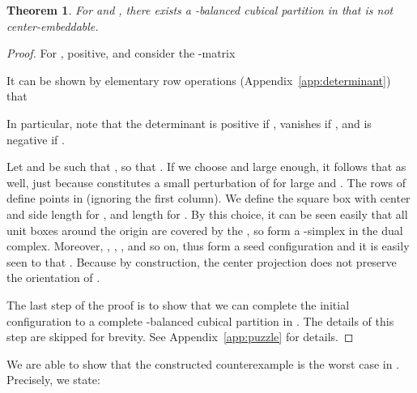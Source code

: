 \documentclass[12pt]{article}
\newtheorem{theorem}{Theorem}
\begin{document}
\begin{theorem}\label{thm:counter_beta_balanced_dd}
For  and , 
there exists a -balanced cubical partition in  that is not
center-embeddable.
\end{theorem}
\begin{proof}
For ,  positive, and  consider the -matrix

It can be shown by elementary row operations (Appendix~\ref{app:determinant}) that

In particular, note that the determinant is positive 
if , vanishes if ,
and is negative if .

Let  and  be such that 
, so that
. If we choose  and 
large enough, it follows that 
as well, just because  constitutes
a small perturbation of  for large  and . 
The rows of  
define  points  in  (ignoring the first column).
We define the square box  with center  and side length 
for , and length  for . By this choice, it can be seen
easily that all  unit boxes around the origin are covered by
the , so  form a -simplex  in the dual complex.
Moreover, , ,
, and so on, thus 
form a seed configuration and it is easily seen to that .
Because  by construction, the center
projection does not preserve the orientation of .

The last step of the proof is to show that we can complete the initial
configuration  to a complete -balanced
cubical partition in . The details of this step are 
skipped for brevity. See Appendix~\ref{app:puzzle} for details.
\end{proof}

We are able to show that the constructed counterexample is the worst case
in . Precisely, we state:
\end{document}
